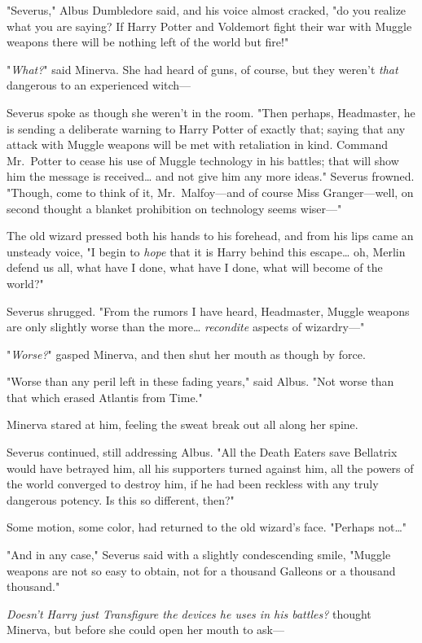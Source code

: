 "Severus," Albus Dumbledore said, and his voice almost cracked, "do you realize 
what you are saying? If Harry Potter and Voldemort fight their war with Muggle 
weapons there will be nothing left of the world but fire!"

"\emph{What?}" said Minerva. She had heard of guns, of course, but they weren't 
\emph{that} dangerous to an experienced witch---

Severus spoke as though she weren't in the room. "Then perhaps, Headmaster, he 
is sending a deliberate warning to Harry Potter of exactly that; saying that 
any attack with Muggle weapons will be met with retaliation in kind. Command 
Mr.~Potter to cease his use of Muggle technology in his battles; that will show 
him the message is received{\ldots} and not give him any more ideas." Severus 
frowned. "Though, come to think of it, Mr.~Malfoy---and of course Miss 
Granger---well, on second thought a blanket prohibition on technology seems 
wiser---"

The old wizard pressed both his hands to his forehead, and from his lips came 
an unsteady voice, "I begin to \emph{hope} that it is Harry behind this 
escape{\ldots} oh, Merlin defend us all, what have I done, what have I done, 
what will become of the world?"

Severus shrugged. "From the rumors I have heard, Headmaster, Muggle weapons are 
only slightly worse than the more{\ldots} \emph{recondite} aspects of 
wizardry---"

"\emph{Worse?}" gasped Minerva, and then shut her mouth as though by force.

"Worse than any peril left in these fading years," said Albus. "Not worse than 
that which erased Atlantis from Time."

Minerva stared at him, feeling the sweat break out all along her spine.

Severus continued, still addressing Albus. "All the Death Eaters save Bellatrix 
would have betrayed him, all his supporters turned against him, all the powers 
of the world converged to destroy him, if he had been reckless with any truly 
dangerous potency. Is this so different, then?"

Some motion, some color, had returned to the old wizard's face. "Perhaps 
not{\ldots}"

"And in any case," Severus said with a slightly condescending smile, "Muggle 
weapons are not so easy to obtain, not for a thousand Galleons or a thousand 
thousand."

\emph{Doesn't Harry just Transfigure the devices he uses in his battles?} 
thought Minerva, but before she could open her mouth to ask---

